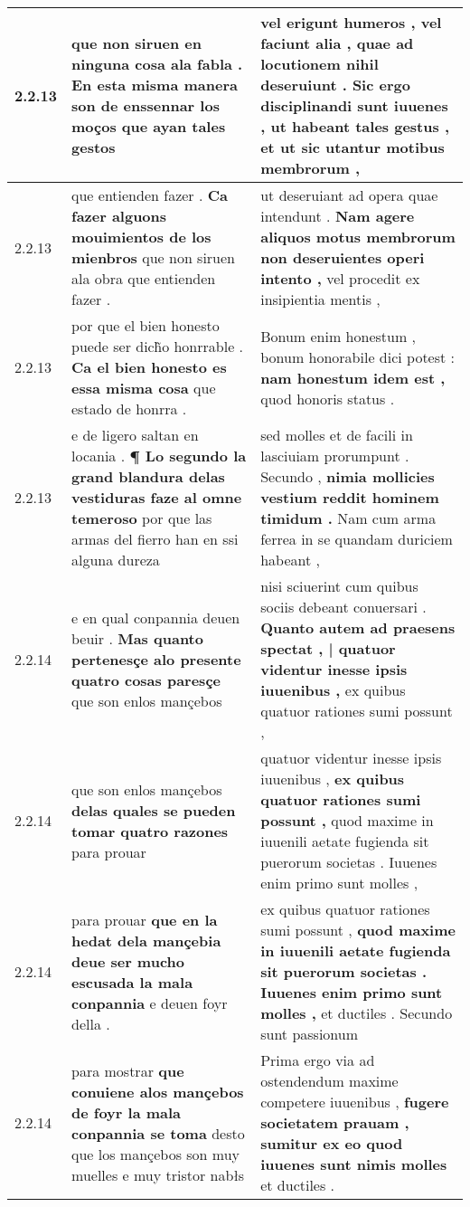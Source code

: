 \begin{tabular}{|p{1cm}|p{6.5cm}|p{6.5cm}|}
2.2.13 & que non siruen en ninguna cosa ala fabla . \textbf{ En esta misma manera son de enssennar los moços } que ayan tales gestos & vel erigunt humeros , vel faciunt alia , \textbf{ quae ad locutionem nihil deseruiunt . Sic ergo disciplinandi sunt iuuenes , } ut habeant tales gestus , et ut sic utantur motibus membrorum , \\\hline
2.2.13 & que entienden fazer . \textbf{ Ca fazer alguons mouimientos de los mienbros } que non siruen ala obra que entienden fazer . & ut deseruiant ad opera quae intendunt . \textbf{ Nam agere aliquos motus membrorum non deseruientes operi intento , } vel procedit ex insipientia mentis , \\\hline
2.2.13 & por que el bien honesto puede ser dich̃o honrrable . \textbf{ Ca el bien honesto es essa misma cosa } que estado de honrra . & Bonum enim honestum , bonum honorabile dici potest : \textbf{ nam honestum idem est , } quod honoris status . \\\hline
2.2.13 & e de ligero saltan en locania . \textbf{ ¶ Lo segundo la grand blandura delas vestiduras faze al omne temeroso } por que las armas del fierro han en ssi alguna dureza & sed molles et de facili in lasciuiam prorumpunt . Secundo , \textbf{ nimia mollicies vestium reddit hominem timidum . } Nam cum arma ferrea in se quandam duriciem habeant , \\\hline
2.2.14 & e en qual conpannia deuen beuir . \textbf{ Mas quanto pertenesçe alo presente quatro cosas paresçe } que son enlos mançebos & nisi sciuerint cum quibus sociis debeant conuersari . \textbf{ Quanto autem ad praesens spectat , | quatuor videntur inesse ipsis iuuenibus , } ex quibus quatuor rationes sumi possunt , \\\hline
2.2.14 & que son enlos mançebos \textbf{ delas quales se pueden tomar quatro razones } para prouar & quatuor videntur inesse ipsis iuuenibus , \textbf{ ex quibus quatuor rationes sumi possunt , } quod maxime in iuuenili aetate fugienda sit puerorum societas . Iuuenes enim primo sunt molles , \\\hline
2.2.14 & para prouar \textbf{ que en la hedat dela mançebia deue ser mucho escusada la mala conpannia } e deuen foyr della . & ex quibus quatuor rationes sumi possunt , \textbf{ quod maxime in iuuenili aetate fugienda sit puerorum societas . Iuuenes enim primo sunt molles , } et ductiles . Secundo sunt passionum \\\hline
2.2.14 & para mostrar \textbf{ que conuiene alos mançebos de foyr la mala conpannia se toma } desto que los mançebos son muy muelles e muy tristor nabłs & Prima ergo via ad ostendendum maxime competere iuuenibus , \textbf{ fugere societatem prauam , sumitur ex eo quod iuuenes sunt nimis molles } et ductiles . \\\hline

\end{tabular}
